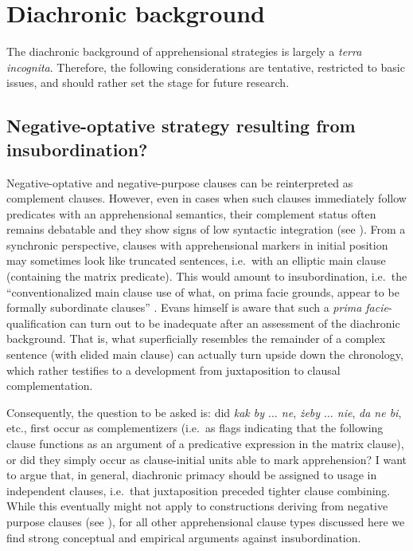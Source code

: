 \documentclass[output=paper,colorlinks,citecolor=brown]{langscibook}
\begin{document}
\section{Diachronic background}
\label{sec:diachronic}

The diachronic background of apprehensional strategies is largely a \textit{terra incognita}. Therefore, the following considerations are tentative, restricted to basic issues, and should rather set the stage for future research.


\subsection{Negative-optative strategy resulting from insubordination?}
\label{subsec:insubordination}

Negative-optative and negative-purpose clauses can be reinterpreted as complement clauses. However, even in cases when such clauses immediately follow predicates with an apprehensional semantics, their complement status often remains debatable and they show signs of low syntactic integration (see ). From a synchronic perspective, clauses with apprehensional markers in initial position may sometimes look like truncated sentences, i.e.\ with an elliptic main clause (containing the matrix predicate). This would amount to insubordination, i.e.\ the ``conventionalized main clause use of what, on prima facie grounds, appear to be formally subordinate clauses'' \citep[367]{evans2007insubordination}. Evans himself is aware that such a \textit{prima facie}-qualification can turn out to be inadequate after an assessment of the diachronic background. That is, what superficially resembles the remainder of a complex sentence (with elided main clause) can actually turn upside down the chronology, which rather testifies to a development from juxtaposition to clausal complementation.


Consequently, the question to be asked is: did  \textit{kak by $\ldots$  ne},  \textit{żeby $\ldots$  nie},  \textit{da ne bi}, etc., first occur as complementizers (i.e.\ as flags indicating that the following clause functions as an argument of a predicative expression in the matrix clause), or did they simply occur as clause-initial units able to mark apprehension? I want to argue that, in general, diachronic primacy should be assigned to usage in independent clauses, i.e.\ that juxtaposition preceded tighter clause combining. While this eventually might not apply to constructions deriving from negative purpose clauses (see ), for all other apprehensional clause types discussed here we find strong conceptual and empirical arguments against insubordination.
\end{document}
